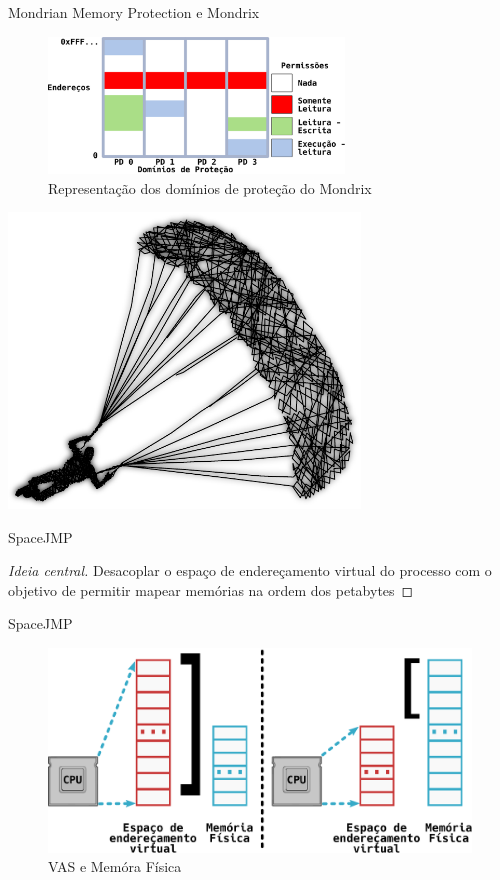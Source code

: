 \documentclass[xcolor={usenames,svgnames,dvipsnames},brazil,english,12pt,aspectratio=149]{beamer}
\begin{document}
\begin{frame}{Mondrian Memory Protection e Mondrix}
  \begin{figure}[!h]
    \centering
    \includegraphics[width=0.7\textwidth]{mondrix_pd}
    \caption{Representação dos domínios de proteção do Mondrix}
    \label{fig:mondrixPD} 
  \end{figure}
\end{frame}

\begin{frame}[plain]
  \includegraphics[width=0.7\textwidth]{presentation_cap2_seven}
\end{frame}

\begin{frame}{SpaceJMP}

  \begin{proof}[Ideia central]
Desacoplar o espaço de endereçamento virtual do processo com o objetivo de
permitir mapear memórias na ordem dos petabytes
  \end{proof}

\end{frame}

\begin{frame}{SpaceJMP}
  \begin{figure}[!h]
    \centering
    \includegraphics[width=.7\textwidth]{vas_vs_physical_address} 
    \caption{VAS e Memóra Física}
    \label{fig:vas_vs_physical} 
  \end{figure}
\end{frame}
\end{document}
